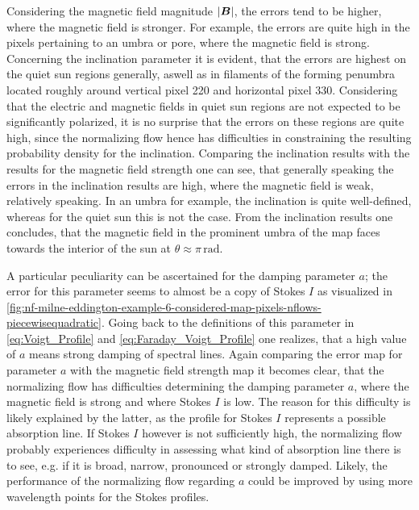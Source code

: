 \documentclass[a4paper,12pt]{report}
\begin{document}
Considering the magnetic field magnitude $|\bm{B}|$, the errors tend to be higher, where the magnetic field is stronger. For example, the errors are quite high in the pixels pertaining to an umbra or pore, where the magnetic field is strong. Concerning the inclination parameter it is evident, that the errors are highest on the quiet sun regions generally, aswell as in filaments of the forming penumbra located roughly around vertical pixel 220 and horizontal pixel 330. Considering that the electric and magnetic fields in quiet sun regions are not expected to be significantly polarized, it is no surprise that the errors on these regions are quite high, since the normalizing flow hence has difficulties in constraining the resulting probability density for the inclination. Comparing the inclination results with the results for the magnetic field strength one can see, that generally speaking the errors in the inclination results are high, where the magnetic field is weak, relatively speaking. In an umbra for example, the inclination is quite well-defined, whereas for the quiet sun this is not the case. From the inclination results one concludes, that the magnetic field in the prominent umbra of the map faces towards the interior of the sun at $\theta \approx \pi\,\si{\radian}$. 

A particular peculiarity can be ascertained for the damping parameter $a$; the error for this parameter seems to almost be a copy of Stokes $I$ as visualized in \cref{fig:nf-milne-eddington-example-6-considered-map-pixels-nflows-piecewisequadratic}. Going back to the definitions of this parameter in \cref{eq:Voigt_Profile} and \cref{eq:Faraday_Voigt_Profile} one realizes, that a high value of $a$ means strong damping of spectral lines. Again comparing the error map for parameter $a$ with the magnetic field strength map it becomes clear, that the normalizing flow has difficulties determining the damping parameter $a$, where the magnetic field is strong and where Stokes $I$ is low. The reason for this difficulty is likely explained by the latter, as the profile for Stokes $I$ represents a possible absorption line. If Stokes $I$ however is not sufficiently high, the normalizing flow probably experiences difficulty in assessing what kind of absorption line there is to see, e.g. if it is broad, narrow, pronounced or strongly damped. Likely, the performance of the normalizing flow regarding $a$ could be improved by using more wavelength points for the Stokes profiles.
\end{document}
